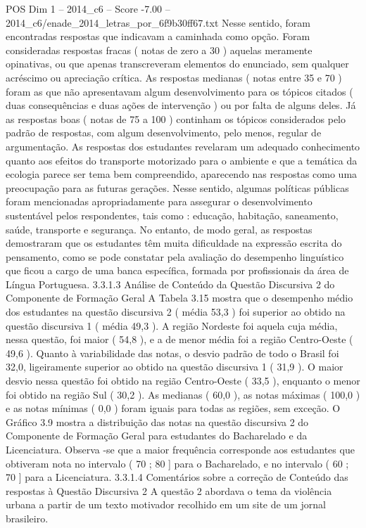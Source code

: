 \begin{textsample}{POS Dim 1 – 2014\_c6 – Score -7.00 – 2014\_c6/enade\_2014\_letras\_por\_6f9b30ff67.txt}
Nesse sentido, foram encontradas respostas que indicavam a caminhada como opção.
Foram consideradas respostas fracas ( notas de zero a 30 ) aquelas meramente opinativas, ou que apenas transcreveram elementos do enunciado, sem qualquer acréscimo ou apreciação crítica.
As respostas medianas ( notas entre 35 e 70 ) foram as que não apresentavam algum desenvolvimento para os tópicos citados ( duas consequências e duas ações de intervenção ) ou por falta de alguns deles.
Já as respostas boas ( notas de 75 a 100 ) continham os tópicos considerados pelo padrão de respostas, com algum desenvolvimento, pelo menos, regular de argumentação.
As respostas dos estudantes revelaram um adequado conhecimento quanto aos efeitos do transporte motorizado para o ambiente e que a temática da ecologia parece ser tema bem compreendido, aparecendo nas respostas como uma preocupação para as futuras gerações.
Nesse sentido, algumas políticas públicas foram mencionadas apropriadamente para assegurar o desenvolvimento sustentável pelos respondentes, tais como : educação, habitação, saneamento, saúde, transporte e segurança.
No entanto, de modo geral, as respostas demostraram que os estudantes têm muita dificuldade na expressão escrita do pensamento, como se pode constatar pela avaliação do desempenho linguístico que ficou a cargo de uma banca específica, formada por profissionais da área de Língua Portuguesa. 3.3.1.3 Análise de Conteúdo da Questão Discursiva 2 do Componente de Formação Geral A Tabela 3.15 mostra que o desempenho médio dos estudantes na questão discursiva 2 ( média 53,3 ) foi superior ao obtido na questão discursiva 1 ( média 49,3 ).
A região Nordeste foi aquela cuja média, nessa questão, foi maior ( 54,8 ), e a de menor média foi a região Centro-Oeste ( 49,6 ).
Quanto à variabilidade das notas, o desvio padrão de todo o Brasil foi 32,0, ligeiramente superior ao obtido na questão discursiva 1 ( 31,9 ).
O maior desvio nessa questão foi obtido na região Centro-Oeste ( 33,5 ), enquanto o menor foi obtido na região Sul ( 30,2 ).
As medianas ( 60,0 ), as notas máximas ( 100,0 ) e as notas mínimas ( 0,0 ) foram iguais para todas as regiões, sem exceção.
O Gráfico 3.9 mostra a distribuição das notas na questão discursiva 2 do Componente de Formação Geral para estudantes do Bacharelado e da Licenciatura.
Observa -se que a maior frequência corresponde aos estudantes que obtiveram nota no intervalo ( 70 ; 80 ] para o Bacharelado, e no intervalo ( 60 ; 70 ] para a Licenciatura. 3.3.1.4 Comentários sobre a correção de Conteúdo das respostas à Questão Discursiva 2 A questão 2 abordava o tema da violência urbana a partir de um texto motivador recolhido em um site de um jornal brasileiro.

\end{textsample}
